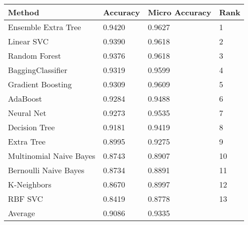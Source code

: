 \begin{tabular}{|l|l|l|l| }
\hline
Method                  & Accuracy & Micro Accuracy & Rank \\ \hline
Ensemble Extra Tree     & 0.9420 & 0.9627 & 1\\
Linear SVC              & 0.9390 & 0.9618 & 2\\
Random Forest           & 0.9376 & 0.9618 & 3\\
BaggingClassifier       & 0.9319 & 0.9599 & 4\\
Gradient Boosting       & 0.9309 & 0.9609 & 5\\
AdaBoost                & 0.9284 & 0.9488 & 6\\
Neural Net              & 0.9273 & 0.9535 & 7\\
Decision Tree           & 0.9181 & 0.9419 & 8\\
Extra Tree              & 0.8995 & 0.9275 & 9\\
Multinomial Naive Bayes & 0.8743 & 0.8907 & 10\\
Bernoulli Naive Bayes   & 0.8734 & 0.8891 & 11\\
K-Neighbors             & 0.8670 & 0.8997 & 12\\
RBF SVC                 & 0.8419 & 0.8778 & 13\\
Average & 0.9086 & 0.9335 & \\
\hline
\end{tabular}